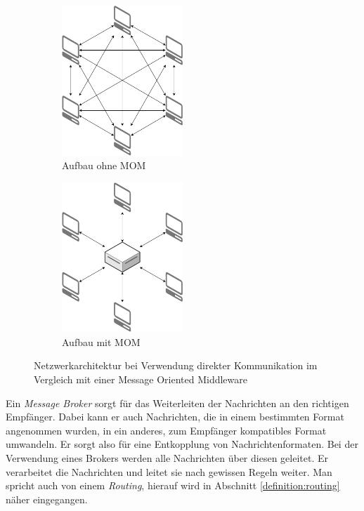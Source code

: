 \begin{figure}[h]
  \centering
  \begin{subfigure}{.49\textwidth}
    \centering
    \includegraphics[width=0.5\textwidth]{figures/rpc.pdf}
    \caption{Aufbau ohne MOM}
    \label{Message Broker:rpcvsmom:rpc}
  \end{subfigure}
  \begin{subfigure}{.49\textwidth}
    \centering
    \includegraphics[width=0.5\textwidth]{figures/broker.pdf}
    \caption{Aufbau mit MOM}
    \label{Message Broker:rpcvsmom:mom}
  \end{subfigure}
  \caption{Netzwerkarchitektur bei Verwendung direkter Kommunikation im Vergleich mit einer Message Oriented Middleware}
  \label{Message Broker:rpcvsmom}
\end{figure}

Ein \textit{Message Broker} sorgt für das Weiterleiten der Nachrichten an den
richtigen Empfänger. Dabei kann er auch Nachrichten, die in
einem bestimmten Format angenommen wurden, in ein anderes, zum Empfänger
kompatibles Format umwandeln. Er sorgt also für eine Entkopplung von
Nachrichtenformaten.
Bei der Verwendung eines Brokers werden alle Nachrichten über diesen geleitet. 
Er verarbeitet die Nach\-richten und leitet sie nach gewissen Regeln weiter.
Man spricht auch von einem \textit{Routing}, hierauf wird in Abschnitt 
\ref{definition:routing} näher eingegangen. \cite{tanenbaum2007distributed}


